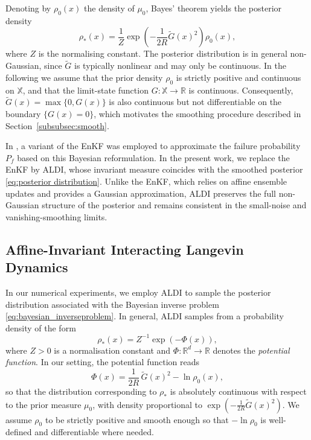 \documentclass[a4paper]{article}
\numberwithin{equation}{section}
\begin{document}
Denoting by \( \rho_0(x) \) the density of $\mu_0$, Bayes’ theorem yields the posterior density
\begin{equation}
    \label{eq:posterior distribution}
    \rho_*(x) = \frac{1}{Z} \exp\!\left(-\frac{1}{2R}\tilde{G}(x)^2\right)\rho_0(x),
\end{equation}
where \( Z \) is the normalising constant. The posterior distribution is in general non-Gaussian, since \( \tilde{G} \) is typically nonlinear and may only be continuous. In the following we assume that the prior density $\rho_0$ is strictly positive
and continuous on $\mathbb X$, and that the limit-state function $G:\mathbb X\to\mathbb R$ is
continuous. Consequently, $\tilde G(x)=\max\{0,G(x)\}$ is also continuous but
not differentiable on the boundary $\{G(x)=0\}$, which motivates the
smoothing procedure described in Section~\ref{subsubsec:smooth}.

In \cite{Wagner21}, a variant of the EnKF was employed to approximate the failure probability \(P_f\) based on this Bayesian reformulation. In the present work, we replace the EnKF by ALDI, whose invariant measure coincides with the smoothed posterior \eqref{eq:posterior distribution}. Unlike the EnKF, which relies on affine ensemble updates and provides a Gaussian approximation, ALDI preserves the full non-Gaussian structure of the posterior and remains consistent in the small-noise and vanishing-smoothing limits.

\subsection{Affine-Invariant Interacting Langevin Dynamics}\label{subsec:ALDI}

In our numerical experiments, we employ ALDI \cite{Nusken20} to sample the posterior distribution associated with the Bayesian inverse problem \eqref{eq:bayesian_inverseproblem}. In general, ALDI samples from a probability density of the form
\[
\rho_*(x) = Z^{-1}\exp(-\Phi(x)),
\]
where \(Z>0\) is a normalisation constant and \(\Phi:\mathbb{R}^d\to\mathbb{R}\) denotes the \emph{potential function}.  
In our setting, the potential function reads
\begin{equation}
    \label{eq:potential_function}
    \Phi(x) = \frac{1}{2R}\,\tilde{G}(x)^2 - \ln \rho_0(x),
\end{equation}
so that the distribution corresponding to $\rho_*$ is absolutely continuous with respect to the prior measure \(\mu_0\), with density proportional to \(\exp(-\tfrac{1}{2R}\tilde{G}(x)^2)\). We assume $\rho_0$ to be strictly positive and smooth enough so that $-\ln \rho_0$ is well-defined and differentiable where needed.
\end{document}
